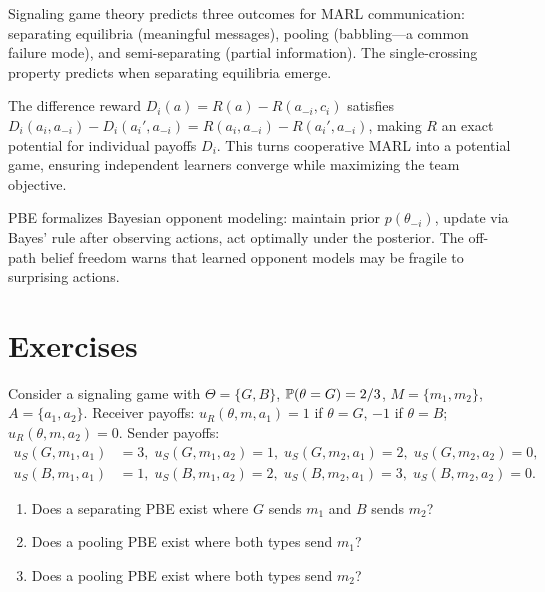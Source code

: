 \documentclass[11pt,a4paper]{article}
\begin{document}
\begin{rlconnection}[title={Signaling and Emergent Communication}]
Signaling game theory predicts three outcomes for MARL communication:
separating equilibria (meaningful messages), pooling (babbling---a common
failure mode), and semi-separating (partial information). The
single-crossing property predicts when separating equilibria emerge.
\end{rlconnection}

\begin{rlconnection}[title={Potential-Based Reward Shaping}]
The difference reward $D_i(a) = R(a) - R(a_{-i}, c_i)$ satisfies
$D_i(a_i, a_{-i}) - D_i(a_i', a_{-i}) = R(a_i, a_{-i})
- R(a_i', a_{-i})$, making $R$ an exact potential for individual payoffs
$D_i$. This turns cooperative MARL into a potential game, ensuring
independent learners converge while maximizing the team objective.
\end{rlconnection}

\begin{rlconnection}[title={Opponent Modeling via PBE}]
PBE formalizes Bayesian opponent modeling: maintain prior
$p(\theta_{-i})$, update via Bayes' rule after observing actions, act
optimally under the posterior. The off-path belief freedom warns that
learned opponent models may be fragile to surprising actions.
\end{rlconnection}


\section{Exercises}
\label{sec:exercises}

\begin{exercise}
\label{ex:simple-signaling}
Consider a signaling game with $\Theta = \{G,B\}$,
$\mathbb{P}(\theta = G) = 2/3$, $M = \{m_1, m_2\}$, $A = \{a_1, a_2\}$.
Receiver payoffs: $u_R(\theta, m, a_1) = 1$ if $\theta = G$,
$-1$ if $\theta = B$; $u_R(\theta, m, a_2) = 0$. Sender payoffs:
\begin{align*}
    u_S(G, m_1, a_1) &= 3, \; u_S(G, m_1, a_2) = 1, \;
    u_S(G, m_2, a_1) = 2, \; u_S(G, m_2, a_2) = 0, \\
    u_S(B, m_1, a_1) &= 1, \; u_S(B, m_1, a_2) = 2, \;
    u_S(B, m_2, a_1) = 3, \; u_S(B, m_2, a_2) = 0.
\end{align*}
\begin{enumerate}[label=(\alph*)]
    \item Does a separating PBE exist where $G$ sends $m_1$ and $B$
    sends $m_2$?
    \item Does a pooling PBE exist where both types send $m_1$?
    \item Does a pooling PBE exist where both types send $m_2$?
\end{enumerate}
\end{exercise}
\end{document}
